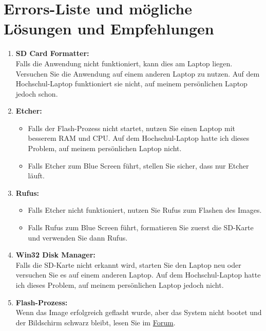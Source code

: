 \documentclass{article}
\begin{document}
\section{Errors-Liste und mögliche Lösungen und Empfehlungen}
\begin{enumerate}

    \item \textbf{SD Card Formatter:}\\
    Falls die Anwendung nicht funktioniert, kann dies am Laptop liegen. Versuchen Sie die Anwendung auf einem anderen Laptop zu nutzen. Auf dem Hochschul-Laptop funktioniert sie nicht, auf meinem persönlichen Laptop jedoch schon.
    \par \bigskip
    \item \textbf{Etcher:}
    \begin{itemize}
        \item Falls der Flash-Prozess nicht startet, nutzen Sie einen Laptop mit besserem RAM und CPU. Auf dem Hochschul-Laptop hatte ich dieses Problem, auf meinem persönlichen Laptop nicht.
        \item Falls Etcher zum Blue Screen führt, stellen Sie sicher, dass nur Etcher läuft.
    \end{itemize}
    \par \bigskip

    \item \textbf{Rufus:}
    \begin{itemize}
        \item Falls Etcher nicht funktioniert, nutzen Sie Rufus zum Flashen des Images.
        \item Falls Rufus zum Blue Screen führt, formatieren Sie zuerst die SD-Karte und verwenden Sie dann Rufus.
    \end{itemize}
    \par \bigskip

    \item \textbf{Win32 Disk Manager:}\\
    Falls die SD-Karte nicht erkannt wird, starten Sie den Laptop neu oder versuchen Sie es auf einem anderen Laptop. Auf dem Hochschul-Laptop hatte ich dieses Problem, auf meinem persönlichen Laptop jedoch nicht.
    \par \bigskip

    \item \textbf{Flash-Prozess:}\\
    Wenn das Image erfolgreich geflasht wurde, aber das System nicht bootet und der Bildschirm schwarz bleibt, lesen Sie im \textcolor{blue}{\href{https://forums.developer.nvidia.com/t/jetson-orin-nano-boot-issue-blank-screen-after-nvidia-logo/309412}{Forum}}.
    \par \bigskip


\end{enumerate}
\end{document}
